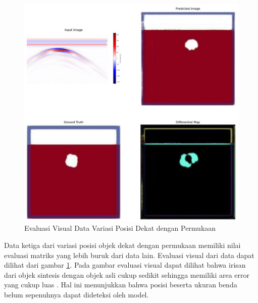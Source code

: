 \begin{figure}[ht]
  \centering
  \includegraphics[scale=0.15]{gambar/diffMapDangkal.jpg}
  \caption{Evaluasi Visual Data Variasi Posisi Dekat dengan Permukaan}
  \label{fig:diffmapdangkal}
\end{figure}

Data ketiga dari variasi posisi objek dekat dengan permukaan memiliki nilai evaluasi matriks yang lebih buruk dari data lain. 
Evaluasi visual dari data dapat dilihat dari gambar \ref{fig:diffmapdangkal}. 
Pada gambar evaluasi visual dapat dilihat bahwa irisan dari objek sintesis dengan objek asli cukup sedikit sehingga memiliki area error yang cukup luas . 
Hal ini menunjukkan bahwa posisi beserta ukuran benda belum sepenuhnya dapat dideteksi oleh model.

